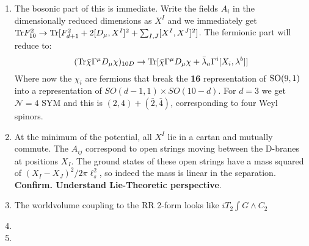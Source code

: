 \documentclass[11pt, class=article, crop=false]{standalone}
\begin{document}
\begin{enumerate}
	\item The bosonic part of this is immediate. Write the fields $A_i$ in the dimensionally reduced dimensions as $X^I$ and we immediately get $\mathrm{Tr} F^2_{10} \to \mathrm{Tr} [F_{d+1}^2 + 2 [D_\mu, X^I]^2 + \sum_{I, J} [X^I, X^J]^2]$. The fermionic part will reduce to:
	\[
		(\mathrm{Tr} \bar \chi \Gamma^\mu D_\mu \chi)_{10D} \to \mathrm{Tr} [\bar \chi \Gamma^\mu D_\mu \chi + \bar \lambda_a \Gamma^{i} [X_i , \lambda^b] ] 
	\] 
	Where now the $\chi_i$ are fermions that break the \textbf{16} representation of $\mathrm{SO}(9,1)$ into a representation of $SO(d-1, 1) \times SO(10-d)$. For $d = 3$ we get $\mathcal N = 4$ SYM and this is $(2, 4) + (\bar 2, \bar 4)$, corresponding to four Weyl spinors. 
	\item At the minimum of the potential, all $X^I$ lie in a cartan and mutually commute. The $A_{ij}$ correspond to open strings moving between the D-branes at positions $X_I$. The ground states of these open strings have a mass squared of $(X_I - X_J)^2/2 \pi \ell_s^2$, so indeed the mass is linear in the separation. \textbf{Confirm. Understand Lie-Theoretic perspective}.
	
	\item The worldvolume coupling to the RR 2-form looks like $i T_2 \int G \wedge C_2$

	\item 
	
	\item 
	
\end{enumerate}

\end{document}
